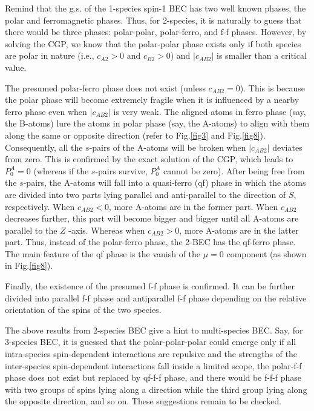 \documentclass[10pt]{wlscirep}
\begin{document}
Remind that the g.s. of the 1-species spin-1 BEC has two well known phases,
the polar and ferromagnetic phases. Thus, for 2-species, it is naturally to
guess that there would be three phases: polar-polar, polar-ferro, and f-f
phases. However, by solving the CGP, we know that the polar-polar phase
exists only if both species are polar in nature (i.e., $c_{A2}>0$ and $%
c_{B2}>0$) and $|c_{AB2}|$ is smaller than a critical value.

The presumed polar-ferro phase does not exist (unless $c_{AB2}=0$). This is
because the polar phase will become extremely fragile when it is influenced
by a nearby ferro phase even when $|c_{AB2}|$ is very weak. The aligned
atoms in ferro phase (say, the B-atoms) lure the atoms in polar phase (say,
the A-atoms) to align with them along the same or opposite direction (refer
to Fig.\ref{fig3} and Fig.\ref{fig8}). Consequently, all the $s$-pairs of
the A-atoms will be broken when $|c_{AB2}|$ deviates from zero. This is
confirmed by the exact solution of the CGP, which leads to $P_{0}^{A}=0$
(whereas if the $s$-pairs survive, $P_{0}^{A}$ cannot be zero). After being
free from the $s$-pairs, the A-atoms will fall into a quasi-ferro (qf) phase
in which the atoms are divided into two parts lying parallel and
anti-parallel to the direction of $S$, respectively. When $c_{AB2}<0$, more
A-atoms are in the former part. When $c_{AB2}$ decreases further, this part
will become bigger and bigger until all A-atoms are parallel to the $Z$%
-axis. Whereas when $c_{AB2}>0$, more A-atoms are in the latter part. Thus,
instead of the polar-ferro phase, the 2-BEC has the qf-ferro phase. The main
feature of the qf phase is the vanish of the $\mu =0$ component (as shown
in Fig.\ref{fig8}).

Finally, the existence of the presumed f-f phase is confirmed. It can be
further divided into parallel f-f phase and antiparallel f-f phase depending
on the relative orientation of the spins of the two species.

The above results from 2-species BEC give a hint to multi-species BEC. Say,
for 3-species BEC, it is guessed that the polar-polar-polar could emerge
only if all intra-species spin-dependent interactions are repulsive and the
strengths of the inter-species spin-dependent interactions fall inside a
limited scope, the polar-f-f phase does not exist but replaced by qf-f-f
phase, and there would be f-f-f phase with two groups of spins lying along a
direction while the third group lying along the opposite direction, and so
on. These suggestions remain to be checked.
\end{document}
